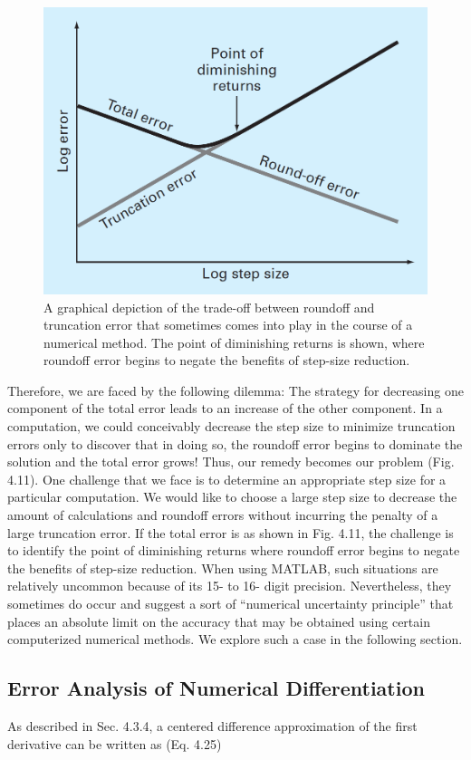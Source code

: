 \documentclass[../main.tex]{subfiles}
\begin{document}
\begin{figure}[h]
    \includegraphics[width=0.6\linewidth]{./images/fig_4_11}
    \caption{A graphical depiction of the trade-off between roundoff and truncation error that sometimes
    comes into play in the course of a numerical method. The point of diminishing returns is
    shown, where roundoff error begins to negate the benefits of step-size reduction.}
\end{figure}

Therefore, we are faced by the following dilemma: The strategy for decreasing one
component of the total error leads to an increase of the other component. In a computation,
we could conceivably decrease the step size to minimize truncation errors only to discover
that in doing so, the roundoff error begins to dominate the solution and the total error
grows! Thus, our remedy becomes our problem (Fig. 4.11). One challenge that we face is
to determine an appropriate step size for a particular computation. We would like to choose
a large step size to decrease the amount of calculations and roundoff errors without incurring
the penalty of a large truncation error. If the total error is as shown in Fig. 4.11, the
challenge is to identify the point of diminishing returns where roundoff error begins to
negate the benefits of step-size reduction.
When using MATLAB, such situations are relatively uncommon because of its 15- to 16-
digit precision. Nevertheless, they sometimes do occur and suggest a sort of ``numerical uncertainty
principle'' that places an absolute limit on the accuracy that may be obtained using
certain computerized numerical methods. We explore such a case in the following section.\\

\subsection{Error Analysis of Numerical Differentiation}
\noindent
As described in Sec. 4.3.4, a centered difference approximation of the first derivative can
be written as (Eq. 4.25)\\
\end{document}
